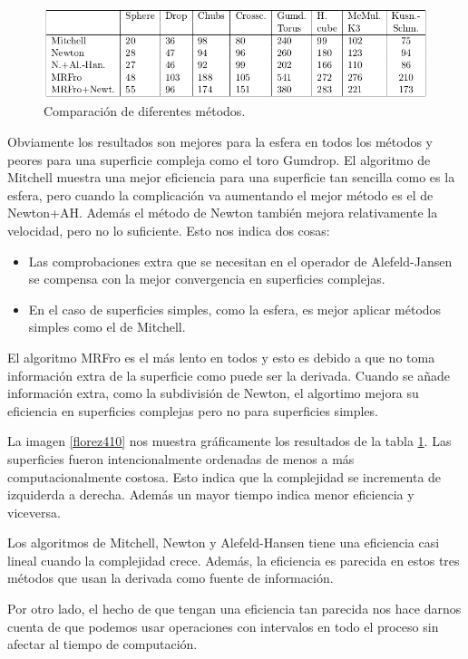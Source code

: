 \begin{figure}[h]
	\centering
	\includegraphics[scale=0.5]{images/florez7.png}
	\caption{Comparación de diferentes métodos.}
	\label{florez41}
\end{figure}

Obviamente los resultados son mejores para la esfera en todos los métodos y peores para una superficie compleja como el toro Gumdrop. El algoritmo de Mitchell muestra una mejor eficiencia para una superficie tan sencilla como es la esfera, pero cuando la complicación va aumentando el mejor método es el de Newton+AH. Además el método de Newton también mejora relativamente la velocidad, pero no lo suficiente. Esto nos indica dos cosas:

\begin{itemize}
\item Las comprobaciones extra que se necesitan en el operador de Alefeld-Jansen se compensa con la mejor convergencia en superficies complejas.
\item En el caso de superficies simples, como la esfera, es mejor aplicar métodos simples como el de Mitchell.
\end{itemize}

El algoritmo MRFro es el más lento en todos y esto es debido a que no toma información extra de la superficie como puede ser la derivada. Cuando se añade información extra, como la subdivisión de Newton, el algortimo mejora su eficiencia en superficies complejas pero no para superficies simples.
\par La imagen \ref{florez410} nos muestra gráficamente los resultados de la tabla \ref{florez41}.  Las superficies fueron intencionalmente ordenadas de menos a más computacionalmente costosa.  Esto indica que la complejidad se incrementa de izquiderda a derecha. Además un mayor tiempo indica menor eficiencia y viceversa.
\par Los algoritmos de Mitchell, Newton y Alefeld-Hansen tiene una eficiencia casi lineal cuando la complejidad crece. Además, la eficiencia es parecida en estos tres métodos que usan la derivada como fuente de información.
\par Por otro lado, el hecho de que tengan una eficiencia tan parecida nos hace darnos cuenta de que podemos usar operaciones con intervalos en todo el proceso sin afectar al tiempo de computación.

